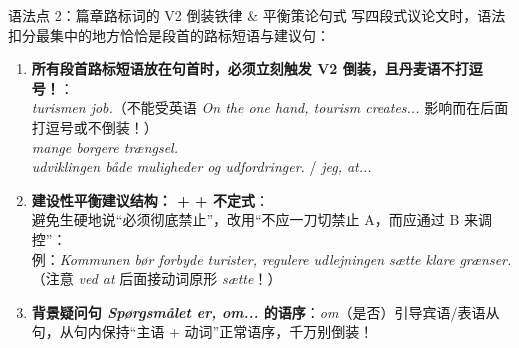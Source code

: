 \begin{grammatikbox}{语法点 2：篇章路标词的 V2 倒装铁律 \& 平衡策论句式}
写四段式议论文时，语法扣分最集中的地方恰恰是段首的路标短语与建议句：
\begin{enumerate}
  \item \textbf{所有段首路标短语放在句首时，必须立刻触发 V2 倒装，且丹麦语不打逗号！}：\\
     \textit{  turismen job.}（不能受英语 \textit{On the one hand, tourism creates...} 影响而在后面打逗号或不倒装！）\\
     \textit{  mange borgere trængsel.} \\
     \textit{  udviklingen både muligheder og udfordringer.} / \textit{  jeg, at...}
  \item \textbf{建设性平衡建议结构： +  + 不定式}：\\
    避免生硬地说“必须彻底禁止”，改用“不应一刀切禁止 A，而应通过 B 来调控”：\\
    例：\textit{Kommunen bør  forbyde turister,  regulere udlejningen  sætte klare grænser.}（注意 \textit{ved at} 后面接动词原形 \textit{sætte}！）
  \item \textbf{背景疑问句 \textit{Spørgsmålet er, om...} 的语序}：\textit{om}（是否）引导宾语/表语从句，从句内保持“主语 + 动词”正常语序，千万别倒装！
\end{enumerate}
\end{grammatikbox}


